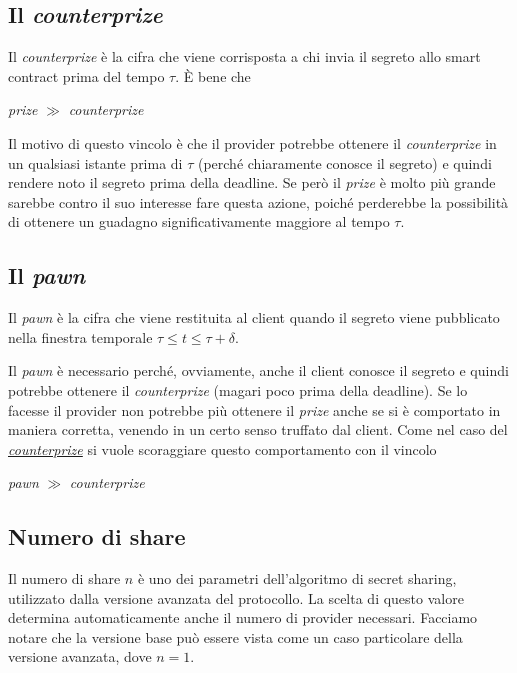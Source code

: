 \subsection{Il \textit{counterprize}}
\label{subsec:counterprize}
Il \textit{counterprize} è la cifra che viene corrisposta a chi invia il segreto
allo smart contract prima del tempo $ \tau $. È bene che
\begin{center}
	\textit{prize} $ \gg $ \textit{counterprize}
\end{center}
Il motivo di questo vincolo è che il provider potrebbe ottenere
il \textit{counterprize} in un qualsiasi istante
prima di $ \tau $ (perché chiaramente conosce il segreto) e quindi
rendere noto il segreto prima della deadline. Se però il
\textit{prize} è molto più grande sarebbe contro il suo
interesse fare questa azione,
poiché perderebbe la possibilità di ottenere un guadagno significativamente
maggiore al tempo $ \tau $.

\subsection{Il \textit{pawn}}
Il \textit{pawn} è la cifra che viene restituita al client quando il segreto
viene pubblicato nella finestra temporale $ \tau \leq t \leq \tau + \delta $.

Il \textit{pawn} è necessario perché, ovviamente, anche il client conosce il segreto
e quindi potrebbe ottenere il \textit{counterprize} (magari poco prima della deadline).
Se lo facesse il provider non potrebbe più ottenere il \textit{prize} anche se si è
comportato in maniera corretta, venendo in un certo senso truffato dal client.
Come nel caso del \hyperref[subsec:counterprize]{\textit{counterprize}}
si vuole scoraggiare questo comportamento con il vincolo
\begin{center}
	\textit{pawn} $ \gg $ \textit{counterprize}
\end{center}

\subsection{Numero di share}
Il numero di share $ n $ è uno dei parametri
dell'algoritmo di secret sharing, utilizzato dalla versione
avanzata del protocollo.
La scelta di questo valore determina automaticamente anche il numero di provider
necessari.
Facciamo notare che la versione base può essere vista come un caso particolare
della versione avanzata, dove $ n = 1 $.

